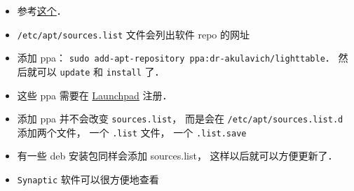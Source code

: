 
\begin{issues}
\issueDraft
\end{issues}


\begin{itemize}
\item 参考\href{https://itsfoss.com/ppa-guide/}{这个}．
\item \verb|/etc/apt/sources.list| 文件会列出软件 repo 的网址
\item 添加 ppa： \verb|sudo add-apt-repository ppa:dr-akulavich/lighttable|． 然后就可以 \verb|update| 和 \verb|install| 了．
\item 这些 ppa 需要在 \href{https://launchpad.net/}{Launchpad} 注册．
\item 添加 ppa 并不会改变 \verb|sources.list|， 而是会在 \verb|/etc/apt/sources.list.d| 添加两个文件， 一个 \verb|.list| 文件， 一个 \verb|.list.save|
\item 有一些 deb 安装包同样会添加 sources.list， 这样以后就可以方便更新了．
\item \verb|Synaptic| 软件可以很方便地查看
\end{itemize}
